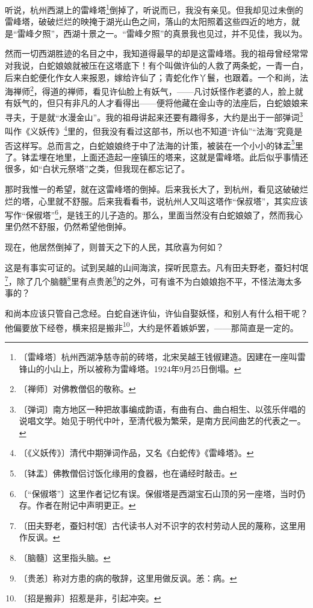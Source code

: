 \documentclass[12pt,UTF-8,openany]{ctexbook}
\begin{document}
\begin{large}
    
    听说，杭州西湖上的雷峰塔\footnote{〔雷峰塔〕杭州西湖净慈寺前的砖塔，北宋吴越王钱俶建造。因建在一座叫雷锋山的小山上，所以被称为雷峰塔。1924年9月25日倒塌。}倒掉了，听说而已，我没有亲见。但我却见过未倒的雷峰塔，破破烂烂的映掩于湖光山色之间，落山的太阳照着这些四近的地方，就是“雷峰夕照”，西湖十景之一。“雷峰夕照”的真景我也见过，并不见佳，我以为。
    
    然而一切西湖胜迹的名目之中，我知道得最早的却是这雷峰塔。我的祖母曾经常常对我说，白蛇娘娘就被压在这塔底下！有个叫做许仙的人救了两条蛇，一青一白，后来白蛇便化作女人来报恩，嫁给许仙了；青蛇化作丫鬟，也跟着。一个和尚，法海禅师\footnote{〔禅师〕对佛教僧侣的敬称。}，得道的禅师，看见许仙脸上有妖气，——凡讨妖怪作老婆的人，脸上就有妖气的，但只有非凡的人才看得出——便将他藏在金山寺的法座后，白蛇娘娘来寻夫，于是就“水漫金山”。我的祖母讲起来还要有趣得多，大约是出于一部弹词\footnote{〔弹词〕南方地区一种把故事编成韵语，有曲有白、曲白相生、以弦乐伴唱的说唱文学。始见于明代中叶，至清代极为繁荣，是南方民间曲艺的代表之一。}叫作《义妖传》\footnote{〔《义妖传》〕清代中期弹词作品，又名《白蛇传》《雷峰塔》。}里的，但我没有看过这部书，所以也不知道“许仙”“法海”究竟是否这样写。总而言之，白蛇娘娘终于中了法海的计策，被装在一个小小的钵盂\footnote{〔钵盂〕佛教僧侣讨饭化缘用的食器，也在诵经时敲击。}里了。钵盂埋在地里，上面还造起一座镇压的塔来，这就是雷峰塔。此后似乎事情还很多，如“白状元祭塔”之类，但我现在都忘记了。
    
    那时我惟一的希望，就在这雷峰塔的倒掉。后来我长大了，到杭州，看见这破破烂烂的塔，心里就不舒服。后来我看看书，说杭州人又叫这塔作“保叔塔”，其实应该写作“保俶塔”\footnote{〔“保俶塔”〕这里作者记忆有误。保俶塔是西湖宝石山顶的另一座塔，当时仍存。作者在附记中声明更正。}，是钱王的儿子造的。那么，里面当然没有白蛇娘娘了，然而我心里仍然不舒服，仍然希望他倒掉。
    
    现在，他居然倒掉了，则普天之下的人民，其欣喜为何如？
    
    这是有事实可证的。试到吴越的山间海滨，探听民意去。凡有田夫野老，蚕妇村氓\footnote{〔田夫野老，蚕妇村氓〕古代读书人对不识字的农村劳动人民的蔑称，这里用作反讽。}，除了几个脑髓\footnote{〔脑髓〕这里指头脑。}里有点贵恙\footnote{〔贵恙〕称对方患的病的敬辞，这里用做反讽。恙：病。}的之外，可有谁不为白娘娘抱不平，不怪法海太多事的？
    
    和尚本应该只管自己念经。白蛇自迷许仙，许仙自娶妖怪，和别人有什么相干呢？他偏要放下经卷，横来招是搬非\footnote{〔招是搬非〕招惹是非，引起冲突。}，大约是怀着嫉妒罢，——那简直是一定的。
    

\end{large}
\end{document}
